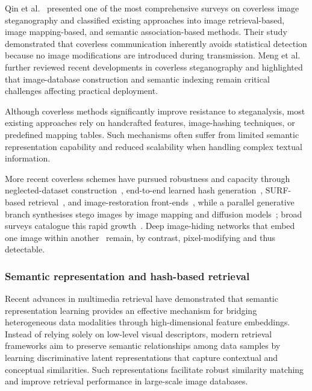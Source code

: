 \documentclass[10pt,a4paper]{article}
\theoremstyle{definition}
\begin{document}
Qin et al.\ \cite{qin} presented one of the most comprehensive surveys on coverless image
steganography and classified existing approaches into image retrieval-based, image
mapping-based, and semantic association-based methods. Their study demonstrated that
coverless communication inherently avoids statistical detection because no image
modifications are introduced during transmission. Meng et al.\ \cite{mengReview} further reviewed
recent developments in coverless steganography and highlighted that image-database
construction and semantic indexing remain critical challenges affecting practical
deployment.

Although coverless methods significantly improve resistance to steganalysis, most
existing approaches rely on handcrafted features, image-hashing techniques, or
predefined mapping tables. Such mechanisms often suffer from limited semantic
representation capability and reduced scalability when handling complex textual
information.

More recent coverless schemes have pursued robustness and capacity through neglected-dataset construction~\cite{neglected2022}, end-to-end learned hash generation~\cite{end2endHash2023}, SURF-based retrieval~\cite{surf2024}, and image-restoration front-ends~\cite{restoration2024}, while a parallel generative branch synthesises stego images by image mapping and diffusion models~\cite{imageMapping2024,diffstega2024}; broad surveys catalogue this rapid growth~\cite{coverlessSurvey2024,dlSurvey2024}. Deep image-hiding networks that embed one image within another~\cite{baluja2017,tancik2020} remain, by contrast, pixel-modifying and thus detectable.

\subsubsection{Semantic representation and hash-based retrieval}
Recent advances in multimedia retrieval have demonstrated that semantic
representation learning provides an effective mechanism for bridging heterogeneous
data modalities through high-dimensional feature embeddings. Instead of relying
solely on low-level visual descriptors, modern retrieval frameworks aim to preserve
semantic relationships among data samples by learning discriminative latent
representations that capture contextual and conceptual similarities. Such
representations facilitate robust similarity matching and improve retrieval
performance in large-scale image databases.
\end{document}
